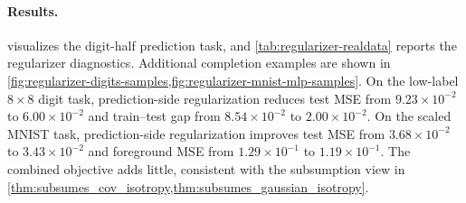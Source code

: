 \paragraph{Results.}
 visualizes the digit-half prediction task,
and \cref{tab:regularizer-realdata} reports the regularizer
diagnostics. Additional completion examples are shown in
\cref{fig:regularizer-digits-samples,fig:regularizer-mnist-mlp-samples}. On
the low-label $8\times 8$ digit task, prediction-side
regularization reduces test MSE from $9.23{\times}10^{-2}$ to
$6.00{\times}10^{-2}$ and train--test gap from $8.54{\times}10^{-2}$ to
$2.00{\times}10^{-2}$. On the scaled MNIST task, prediction-side regularization
improves test MSE from $3.68{\times}10^{-2}$ to $3.43{\times}10^{-2}$ and
foreground MSE from $1.29{\times}10^{-1}$ to $1.19{\times}10^{-1}$. The
combined objective adds little, consistent with the subsumption view in
\cref{thm:subsumes_cov_isotropy,thm:subsumes_gaussian_isotropy}.

